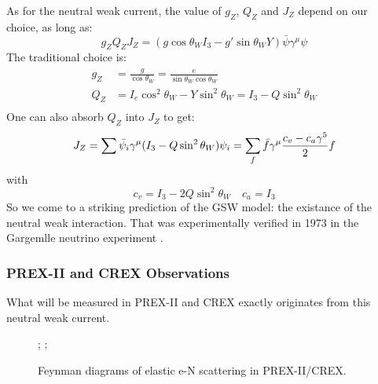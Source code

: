 As for the neutral weak current, the value of $g_Z$, $Q_Z$ and $J_Z$ depend on our choice, 
as long as:
\begin{equation}
    g_Z Q_Z J_Z = (g\cos\theta_W I_3 - g'\sin\theta_W Y)\bar{\psi}\gamma^\mu\psi 
\end{equation}
The traditional choice is:
\begin{equation}
    \begin{aligned}
	g_Z &= \frac{g}{\cos\theta_W} = \frac{e}{\sin\theta_W\cos\theta_W}  \\
	Q_Z &= I_e\cos^2\theta_W - Y\sin^2\theta_W = I_3 - Q\sin^2\theta_W  \\
    \end{aligned}
\end{equation}
One can also absorb $Q_Z$ into $J_Z$ to get:
\begin{equation}
    J_Z = \sum \bar{\psi}_i\gamma^\mu (I_3 - Q\sin^2\theta_W)\psi_i
	= \sum_f \bar{f}\gamma^\mu\frac{c_v - c_a\gamma^5}{2} f \\
\end{equation}
with 
\begin{equation}
    c_v = I_3 - 2Q\sin^2\theta_W    \quad c_a = I_3
\end{equation}
So we come to a striking prediction of the GSW model: the existance of the neutral weak interaction.
That was experimentally verified in 1973 in the Gargemlle neutrino experiment \cite{HASERT19741}.

\subsubsection{PREX-II and CREX Observations}
What will be measured in PREX-II and CREX exactly originates from this neutral weak current.

\begin{figure}[!h]
    \centering
{};
;
    \caption{Feynman diagrams of elastic e-N scattering in PREX-II/CREX.}
\end{figure}

